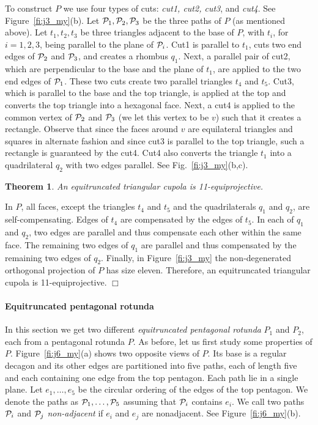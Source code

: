 \documentclass{article}
\newtheorem{theorem}{Theorem}
\newenvironment{proof}
{{\noindent\bf Proof}}{$\Box$}
\begin{document}
To construct $P$ we use four types of cuts: \emph{cut1, cut2, cut3}, and \emph{cut4}.
See Figure~\ref{fi:j3_my}(b).
Let ${\cal P}_1, {\cal P}_2, {\cal P}_3$ be the three paths of $P$ (as mentioned above).
Let $t_1, t_2, t_3$ be three triangles adjacent to the base of $P$,
with $t_i$, for $i=1,2,3$, being parallel to the plane of ${\cal P}_i$. 
Cut1 is parallel to $t_1$, cuts two end edges of ${\cal P}_2$ and ${\cal P}_3$,
and creates a rhombus $q_1$.
Next, a parallel pair of cut2, which are perpendicular to the base and 
the plane of $t_1$, are applied to the two end edges of ${\cal P}_1$.
These two cuts create two parallel triangles $t_4$ and $t_5$.
Cut3, which is parallel to the base and the top triangle, 
is applied at the top and converts the top triangle into a hexagonal face.
Next, a cut4 is applied to the common vertex of ${\cal P}_2$ and ${\cal P}_3$
(we let this vertex to be $v$) such that it creates a rectangle. 
Observe that since the faces around $v$ are equilateral triangles and squares in alternate fashion
and since cut3 is parallel to the top triangle, such a rectangle is guaranteed by the cut4.
Cut4 also converts the triangle $t_1$ into a quadrilateral $q_2$ with two edges parallel.
See Fig.~\ref{fi:j3_my}(b,c).


\begin{theorem}
\label{th:P3}
An equitruncated triangular cupola is 11-equiprojective.
\end{theorem}

\begin{proof}
In $P$, all faces, except the triangles $t_4$ and $t_5$ and the quadrilaterals $q_1$ and $q_2$,
are self-compensating.
Edges of $t_4$ are compensated by the edges of $t_5$.
In each of $q_1$ and $q_2$, two edges are parallel and thus compensate each other
within the same face.
The remaining two edges of $q_1$ are parallel and thus compensated by the remaining two edges of $q_2$.
Finally, in  Figure~\ref{fi:j3_my} the non-degenerated orthogonal projection of $P$ has size eleven.
Therefore, an equitruncated triangular cupola is 11-equiprojective.
\end{proof}


\paragraph{Equitruncated pentagonal rotunda}
In this section we get two different \emph{equitruncated pentagonal rotunda} $P_1$ and $P_2$,
each from a pentagonal rotunda $P$.
As before, let us first study some properties of $P$.
Figure~\ref{fi:j6_my}(a) shows two opposite views of $P$.
Its base is a regular decagon and its other edges are partitioned into five paths, 
each of length five and each containing one edge from the top pentagon.
Each path lie in a single plane. 
Let $e_1,\ldots,e_5$ be the circular ordering of the edges of the top pentagon.
We denote the paths as ${\cal P}_1,\ldots,{\cal P}_5$ assuming that ${\cal P}_i$
contains $e_i$.
We call two paths ${\cal P}_i$ and ${\cal P}_j$ {\it non-adjacent} if $e_i$ and $e_j$
are nonadjacent. See Figure~\ref{fi:j6_my}(b).
\end{document}
